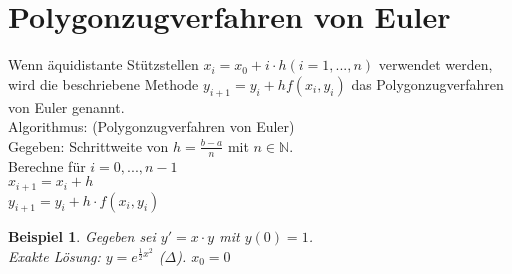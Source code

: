 \documentclass[fontset=ubuntu,12pt,a4paper]{scrreprt}
\newtheorem{beispiel}[defi]{Beispiel}
\begin{document}
\section{Polygonzugverfahren von Euler}
Wenn äquidistante Stützstellen $x_i=x_0+i\cdot h (i=1,...,n)$ verwendet werden, wird die beschriebene Methode $y_{i+1}=y_i+hf(x_i,y_i)$ das Polygonzugverfahren von Euler genannt.
\\ Algorithmus: (Polygonzugverfahren von Euler) \\
Gegeben: Schrittweite von $h=\frac{b-a}{n}$ mit $n\in\mathbb{N}$.\\
Berechne für $i=0,...,n-1$\\ $x_{i+1}=x_i+h$ \\$y_{i+1}=y_i+h\cdot f(x_i,y_i)$\\
\begin{beispiel}
	Gegeben sei $y'=x\cdot y$ mit $y(0)=1$. \\
	Exakte Lösung: $y=e^{\frac{1}{2}x^2}$ ($\Delta$).
	$x_0=0 $
\end{beispiel}
\end{document}
